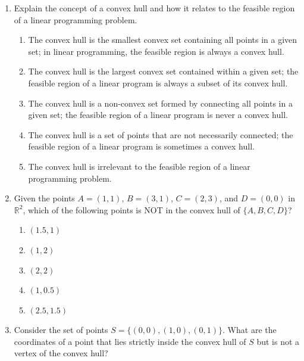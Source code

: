 \documentclass{article}%
\begin{document}
\begin{enumerate}
\begin{enumerate}
\item Weak duality provides a bound on the optimal objective function values of both the primal and dual problems, guiding the search for optimal solutions.%
\item Weak duality is used to prove the strong duality theorem in the B&N method.%
\item Weak duality is only relevant if the primal problem is infeasible.%
\item Weak duality is not directly used in the B&N method.%
\end{enumerate}%
\vspace{1em}%
\item Explain the concept of a convex hull and how it relates to the feasible region of a linear programming problem.%
\begin{enumerate}%
\item The convex hull is the smallest convex set containing all points in a given set; in linear programming, the feasible region is always a convex hull.%
\item The convex hull is the largest convex set contained within a given set; the feasible region of a linear program is always a subset of its convex hull.%
\item The convex hull is a non-convex set formed by connecting all points in a given set; the feasible region of a linear program is never a convex hull.%
\item The convex hull is a set of points that are not necessarily connected; the feasible region of a linear program is sometimes a convex hull.%
\item The convex hull is irrelevant to the feasible region of a linear programming problem.%
\end{enumerate}%
\vspace{1em}%
\item Given the points $A=(1,1)$, $B=(3,1)$, $C=(2,3)$, and $D=(0,0)$ in $\mathbb{R}^2$, which of the following points is NOT in the convex hull of $\{A, B, C, D\}$?%
\begin{enumerate}%
\item $(1.5, 1)$%
\item $(1, 2)$%
\item $(2, 2)$%
\item $(1, 0.5)$%
\item $(2.5, 1.5)$%
\end{enumerate}%
\vspace{1em}%
\item Consider the set of points $S = \{(0,0), (1,0), (0,1)\}$.  What are the coordinates of a point that lies strictly inside the convex hull of $S$ but is not a vertex of the convex hull?%

\end{enumerate}
\end{document}
